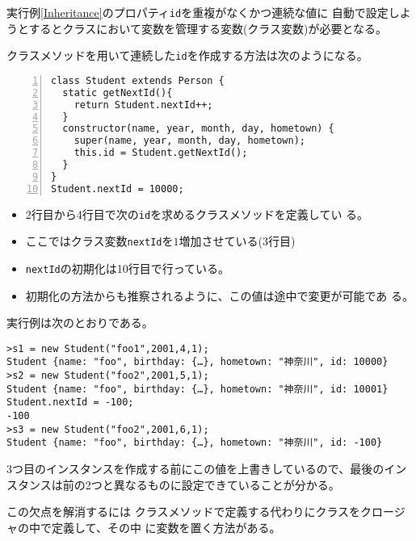 実行例\ref{Inheritance}のプロパティ\texttt{id}を重複がなくかつ連続な値に
自動で設定しようとするとクラスにおいて変数を管理する変数(クラス変数)が必要となる。
\begin{Exec}\upshape
クラスメソッドを用いて連続した\texttt{id}を作成する方法は次のようになる。
\begin{Verbatim}[numbers=left]
class Student extends Person {
  static getNextId(){
    return Student.nextId++;
  }
  constructor(name, year, month, day, hometown) {
    super(name, year, month, day, hometown);
    this.id = Student.getNextId();
  }
}
Student.nextId = 10000;
\end{Verbatim}
\begin{itemize}
 \item 2行目から4行目で次の\texttt{id}を求めるクラスメソッドを定義してい
       る。
 \item ここではクラス変数\texttt{nextId}を$1$増加させている(3行目)
 \item \texttt{nextId}の初期化は10行目で行っている。
 \item 初期化の方法からも推察されるように、この値は途中で変更が可能であ
       る。
\end{itemize}
実行例は次のとおりである。
\begin{Verbatim}
>s1 = new Student("foo1",2001,4,1);
Student {name: "foo", birthday: {…}, hometown: "神奈川", id: 10000}
>s2 = new Student("foo2",2001,5,1);
Student {name: "foo", birthday: {…}, hometown: "神奈川", id: 10001}
Student.nextId = -100;
-100
>s3 = new Student("foo2",2001,6,1);
Student {name: "foo", birthday: {…}, hometown: "神奈川", id: -100}
\end{Verbatim}
3つ目のインスタンスを作成する前にこの値を上書きしているので、最後のイン
スタンスは前の2つと異なるものに設定できていることが分かる。

\end{Exec}

この欠点を解消するには
クラスメソッドで定義する代わりにクラスをクロージャの中で定義して、その中
に変数を置く方法がある。

